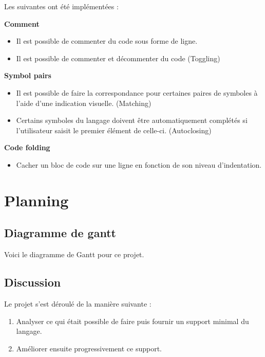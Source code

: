 \documentclass[
    iict, %
    il, %
]{heig-tb}
\begin{document}
Les suivantes ont été implémentées :

\textbf{Comment}
\begin{itemize}
    \item Il est possible de commenter du code sous forme de ligne.
    \item Il est possible de commenter et décommenter du code (Toggling)
\end{itemize}

\textbf{Symbol pairs}
\begin{itemize}
    \item Il est possible de faire la correspondance pour certaines paires de symboles à l'aide d'une indication visuelle. (Matching)
    \item Certains symboles du langage doivent être automatiquement complétés si l'utilisateur saisit le premier élément de celle-ci. (Autoclosing)
\end{itemize}

\textbf{Code folding}
\begin{itemize}
    \item Cacher un bloc de code sur une ligne en fonction de son niveau d'indentation.
\end{itemize}


\chapter{Planning}

\section{Diagramme de gantt}
Voici le diagramme de Gantt pour ce projet.



\section{Discussion}

Le projet s'est déroulé de la manière suivante :
\begin{enumerate}
    \item Analyser ce qui était possible de faire puis fournir un support minimal du langage.
    \item Améliorer ensuite progressivement ce support.
\end{enumerate}
\end{document}

